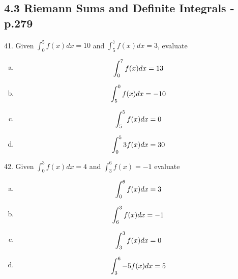 \documentclass[11pt]{article}
\newcommand*{\set}{\setcounter{equation}{0}}
\begin{document}
\subsection{4.3 Riemann Sums and Definite Integrals - p.279}
41. Given $\int_{0}^{5}f(x)dx=10$ and $\int_{5}^{7}f(x)dx=3$, evaluate
\begin{enumerate}[(a)]
    \item
        \begin{align}
            \set
            \int_{0}^{7}f(x)dx=13
        \end{align}    
    \item
        \begin{align}
            \set
            \int_{5}^{0}f(x)dx=-10
        \end{align}
    \item
        \begin{align}
            \set
            \int_{5}^{5}f(x)dx=0
        \end{align}
    \item
        \begin{align}
            \set
            \int_{0}^{5}3f(x)dx=30
        \end{align}
\end{enumerate}

42. Given $\int_{0}^{3}f(x)dx=4$ and $\int_{3}^{6}f(x)=-1$ evaluate
\begin{enumerate}[(a)]
    \item
        \begin{align}
            \set
            \int_{0}^{6}f(x)dx=3
        \end{align}
    \item
        \begin{align}
            \set
            \int_{6}^{3}f(x)dx=-1
        \end{align}
    \item
        \begin{align}
            \set
            \int_{3}^{3}f(x)dx=0
        \end{align}
    \item
        \begin{align}
            \set
            \int_{3}^{6}-5f(x)dx=5
        \end{align}
\end{enumerate}
\end{document}
